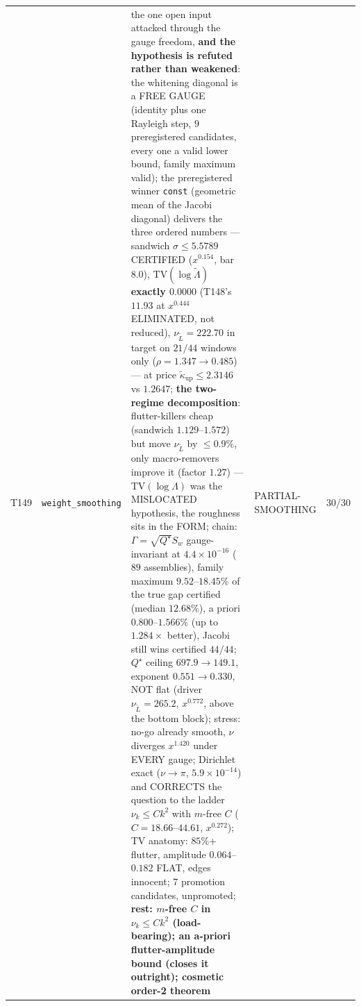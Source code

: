 \documentclass[11pt,a4paper]{article}
\begin{document}
{\begin{xltabular}{\linewidth}{@{}p{0.95cm} >{\raggedright\arraybackslash}p{3.1cm} Y >{\raggedright\scriptsize\arraybackslash}p{3.35cm} p{1.15cm}@{}}
T149 & \texttt{\scriptsize weight\_\allowbreak smoothing} & the one open input attacked through the gauge freedom, \textbf{and the hypothesis is refuted rather than weakened}: the whitening diagonal is a FREE GAUGE (identity plus one Rayleigh step, $9$ preregistered candidates, every one a valid lower bound, family maximum valid); the preregistered winner \texttt{const} (geometric mean of the Jacobi diagonal) delivers the three ordered numbers --- sandwich $\sigma\le5.5789$ CERTIFIED ($x^{0.154}$, bar $8.0$), $\mathrm{TV}(\log\tilde\Lambda)$ \textbf{exactly $0.0000$} (T148's $11.93$ at $x^{0.444}$ ELIMINATED, not reduced), $\nu_{\tilde L}=222.70$ in target on $21/44$ windows only ($\rho=1.347\to0.485$) --- at price $\tilde\kappa_{\mathrm{up}}\le2.3146$ vs $1.2647$; \textbf{the two-regime decomposition}: flutter-killers cheap (sandwich $1.129$--$1.572$) but move $\nu_{\tilde L}$ by $\le0.9\%$, only macro-removers improve it (factor $1.27$) --- $\mathrm{TV}(\log\Lambda)$ was the MISLOCATED hypothesis, the roughness sits in the FORM; chain: $\Gamma=\sqrt{Q^\star}S_w$ gauge-invariant at $4.4\times10^{-16}$ ($89$ assemblies), family maximum $9.52$--$18.45\%$ of the true gap certified (median $12.68\%$), a priori $0.800$--$1.566\%$ (up to $1.284\times$ better), Jacobi still wins certified $44/44$; $Q^\star$ ceiling $697.9\to149.1$, exponent $0.551\to0.330$, NOT flat (driver $\nu_{\tilde L}=265.2$, $x^{0.772}$, above the bottom block); stress: no-go already smooth, $\nu$ diverges $x^{1.420}$ under EVERY gauge; Dirichlet exact ($\nu\to\pi$, $5.9\times10^{-14}$) and CORRECTS the question to the ladder $\nu_k\le Ck^2$ with $m$-free $C$ ($C=18.66$--$44.61$, $x^{0.272}$); TV anatomy: $85\%$+ flutter, amplitude $0.064$--$0.182$ FLAT, edges innocent; $7$ promotion candidates, unpromoted; \textbf{rest: $m$-free $C$ in $\nu_k\le Ck^2$ (load-bearing); an a-priori flutter-amplitude bound (closes it outright); cosmetic order-2 theorem} & PARTIAL-SMOOTHING & 30/30\\

\end{xltabular}}
\end{document}
